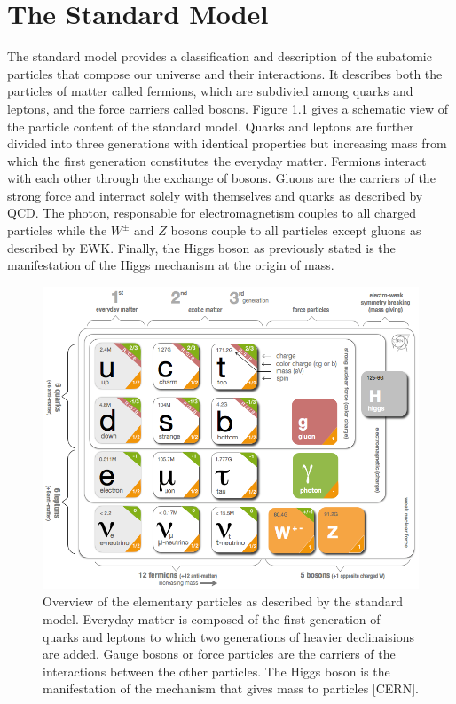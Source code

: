 \chapter{The Standard Model}
\label{chap:I-1-standard-model}

  The standard model provides a classification and description of the subatomic particles that compose our universe and their interactions. It describes both the particles of matter called fermions, which are subdivied among quarks and leptons, and the force carriers called bosons. Figure \ref{fig:I-1-sm-particles} gives a schematic view of the particle content of the standard model. Quarks and leptons are further divided into three generations with identical properties but increasing mass from which the first generation constitutes the everyday matter. Fermions interact with each other through the exchange of bosons. Gluons are the carriers of the strong force and interract solely with themselves and quarks as described by QCD. The photon, responsable for electromagnetism couples to all charged particles while the $ W^\pm $ and $ Z $ bosons couple to all particles except gluons as described by EWK. Finally, the Higgs boson as previously stated is the manifestation of the Higgs mechanism at the origin of mass. \\

	\begin{figure}[h!]
		\centering
		\includegraphics[width = 0.8 \textwidth]{img/I-1/sm-particles.png}
		\caption{Overview of the elementary particles as described by the standard model. Everyday matter is composed of the first generation of quarks and leptons to which two generations of heavier declinaisions are added. Gauge bosons or force particles are the carriers of the interactions between the other particles. The Higgs boson is the manifestation of the mechanism that gives mass to particles [CERN].}
		\label{fig:I-1-sm-particles}
	\end{figure}

